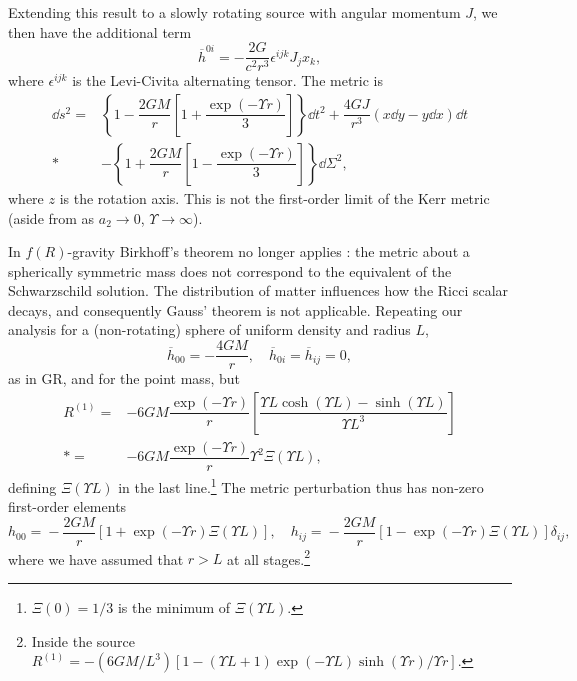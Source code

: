 Extending this result to a slowly rotating source with angular momentum $J$, we then have the additional term \citep[section 13.20]{Hobson2006}
\begin{equation}
\overline{h}^{0i} = -\dfrac{2G}{c^2r^3} \epsilon^{ijk}J_j x_k,
\end{equation}
where $\epsilon^{ijk}$ is the Levi-Civita alternating tensor. The metric is
\begin{align}
\dd s^2 = {} & \left\{1-\dfrac{2GM}{r}\left[1 + \dfrac{\exp(- \Upsilon r)}{3}\right]\right\}\dd t^2 + \dfrac{4GJ}{r^3}\left(x\dd y - y\dd x\right)\dd t \nonumber \\*
 & - {} \left\{1 +\dfrac{2GM}{r}\left[1 - \dfrac{\exp(- \Upsilon r)}{3}\right]\right\}\dd \Sigma^2,\label{eq:f(R)_Kerr}
\end{align}
where $z$ is the rotation axis. This is not the first-order limit of the Kerr metric (aside from as $a_2 \rightarrow 0$, $\Upsilon \rightarrow \infty$).

In $f(R)$-gravity Birkhoff's theorem no longer applies \citep{Pechlaner1966, Stelle1978, Clifton2006, Capozziello2009b, Stabile2010}: the metric about a spherically symmetric mass does not correspond to the equivalent of the Schwarzschild solution. The distribution of matter influences how the Ricci scalar decays, and consequently Gauss' theorem is not applicable. Repeating our analysis for a (non-rotating) sphere of uniform density and radius $L$,
\begin{equation}
\overline{h}_{00} = -\dfrac{4GM}{r}, \quad \overline{h}_{0i} = \overline{h}_{ij} = 0,
\end{equation}
as in GR, and for the point mass, but
\begin{align}
R^{(1)} = {} & -6 G M \dfrac{\exp(- \Upsilon r)}{r}\left[\dfrac{\Upsilon L\cosh(\Upsilon L) - \sinh(\Upsilon L)}{\Upsilon L^3}\right] \nonumber \\*
 = {} &  -6 G M \dfrac{\exp(- \Upsilon r)}{r}\Upsilon^2\Xi(\Upsilon L),
\end{align}
defining $\Xi(\Upsilon L)$ in the last line.\footnote{$\Xi(0) = 1/3$ is the minimum of $\Xi(\Upsilon L)$.} The metric perturbation thus has non-zero first-order elements \citep{Stelle1978, Capozziello2009b, Stabile2010}
\begin{equation}
h_{00} = {} -\dfrac{2 G M}{r} \left[1 + \exp(- \Upsilon r)\Xi(\Upsilon L)\right], \quad
h_{ij} = {} -\dfrac{2 G M}{r} \left[1 - \exp(- \Upsilon r)\Xi(\Upsilon L)\right]\delta_{ij},
\label{eq:Uniform}
\end{equation}
where we have assumed that $r > L$ at all stages.\footnote{Inside the source $R^{(1)} = -{(6 G M/{L^3})}[1 - (\Upsilon L + 1)\exp(-\Upsilon L) \sinh(\Upsilon r)/\Upsilon r]$.}

